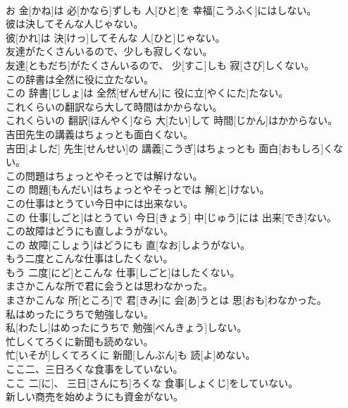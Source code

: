\documentclass[8pt]{extreport}
\begin{document}
\begin{CJK}{UTF8}{min}
\\	お 金[かね]は 必[かなら]ずしも 人[ひと]を 幸福[こうふく]にはしない。
\\	彼は決してそんな人じゃない。	
\\	彼[かれ]は 決[けっ]してそんな 人[ひと]じゃない。
\\	友達がたくさんいるので、少しも寂しくない。	
\\	友達[ともだち]がたくさんいるので、 少[すこ]しも 寂[さび]しくない。
\\	この辞書は全然に役に立たない。	
\\	この 辞書[じしょ]は 全然[ぜんぜん]に 役に立[やくにた]たない。
\\	これくらいの翻訳なら大して時間はかからない。	
\\	これくらいの 翻訳[ほんやく]なら 大[たい]して 時間[じかん]はかからない。
\\	吉田先生の講義はちょっとも面白くない。	
\\	吉田[よしだ] 先生[せんせい]の 講義[こうぎ]はちょっとも 面白[おもしろ]くない。
\\	この問題はちょっとやそっとでは解けない。	
\\	この 問題[もんだい]はちょっとやそっとでは 解[と]けない。
\\	この仕事はとうてい今日中には出来ない。	
\\	この 仕事[しごと]はとうてい 今日[きょう] 中[じゅう]には 出来[でき]ない。
\\	この故障はどうにも直しようがない。	
\\	この 故障[こしょう]はどうにも 直[なお]しようがない。
\\	もう二度とこんな仕事はしたくない。	
\\	もう 二度[にど]とこんな 仕事[しごと]はしたくない。
\\	まさかこんな所で君に会うとは思わなかった。	
\\	まさかこんな 所[ところ]で 君[きみ]に 会[あ]うとは 思[おも]わなかった。
\\	私はめったにうちで勉強しない。	
\\	私[わたし]はめったにうちで 勉強[べんきょう]しない。
\\	忙しくてろくに新聞も読めない。	
\\	忙[いそが]しくてろくに 新聞[しんぶん]も 読[よ]めない。
\\	ここ二、三日ろくな食事をしていない。	
\\	ここ 二[に]、 三日[さんにち]ろくな 食事[しょくじ]をしていない。
\\	新しい商売を始めようにも資金がない。	

\end{CJK}
\end{document}
